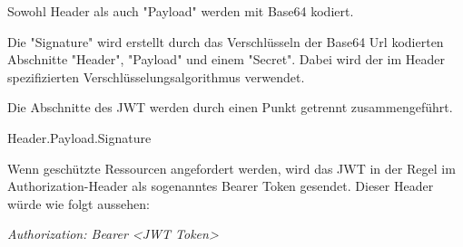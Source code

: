 Sowohl Header als auch "Payload" werden mit Base64 kodiert.

Die "Signature" wird erstellt durch das Verschlüsseln der Base64 Url kodierten Abschnitte "Header", "Payload" und einem "Secret". 
Dabei wird der im Header spezifizierten Verschlüsselungsalgorithmus verwendet.\cite{RFC7519}\cite{WdsJWT}

Die Abschnitte des JWT werden durch einen Punkt getrennt zusammengeführt. 

{\ttfamily Header.Payload.Signature}

Wenn geschützte Ressourcen angefordert werden, wird das JWT in der Regel im Authorization-Header als sogenanntes Bearer Token gesendet. Dieser Header würde wie folgt aussehen\cite{Auth0JWT}:

\emph{Authorization: Bearer \textless JWT Token\textgreater}


